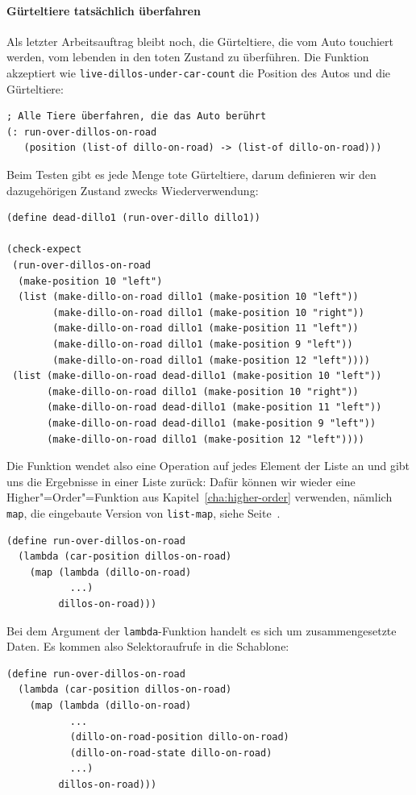 \paragraph{Gürteltiere tatsächlich überfahren} Als letzter
Arbeitsauftrag bleibt noch, die Gürteltiere, die vom Auto touchiert
werden, vom lebenden in den toten Zustand zu überführen.  Die Funktion
akzeptiert wie \lstinline{live-dillos-under-car-count} die Position
des Autos und die Gürteltiere:
%
\begin{lstlisting}
; Alle Tiere überfahren, die das Auto berührt
(: run-over-dillos-on-road
   (position (list-of dillo-on-road) -> (list-of dillo-on-road)))
\end{lstlisting}
%
Beim Testen gibt es jede Menge tote Gürteltiere, darum definieren wir
den dazugehörigen Zustand zwecks Wiederverwendung:
%
\begin{lstlisting}
(define dead-dillo1 (run-over-dillo dillo1))

(check-expect
 (run-over-dillos-on-road
  (make-position 10 "left")
  (list (make-dillo-on-road dillo1 (make-position 10 "left"))
        (make-dillo-on-road dillo1 (make-position 10 "right"))
        (make-dillo-on-road dillo1 (make-position 11 "left"))
        (make-dillo-on-road dillo1 (make-position 9 "left"))
        (make-dillo-on-road dillo1 (make-position 12 "left"))))
 (list (make-dillo-on-road dead-dillo1 (make-position 10 "left"))
       (make-dillo-on-road dillo1 (make-position 10 "right"))
       (make-dillo-on-road dead-dillo1 (make-position 11 "left"))
       (make-dillo-on-road dead-dillo1 (make-position 9 "left"))
       (make-dillo-on-road dillo1 (make-position 12 "left"))))
\end{lstlisting}
%
Die Funktion wendet also eine Operation auf jedes Element der Liste an
und gibt uns die Ergebnisse in einer Liste zurück: Dafür können wir
wieder eine Higher"=Order"=Funktion aus Kapitel~\ref{cha:higher-order}
verwenden, nämlich \lstinline{map}, die eingebaute Version von
\lstinline{list-map}, siehe Seite~\pageref{func:map}.
%
\begin{lstlisting}
(define run-over-dillos-on-road
  (lambda (car-position dillos-on-road)
    (map (lambda (dillo-on-road)
           ...)
         dillos-on-road)))
\end{lstlisting}
%
Bei dem Argument der \lstinline{lambda}-Funktion handelt es sich um
zusammengesetzte Daten.  Es kommen also Selektoraufrufe in die
Schablone:
%
\begin{lstlisting}
(define run-over-dillos-on-road
  (lambda (car-position dillos-on-road)
    (map (lambda (dillo-on-road)
           ...
           (dillo-on-road-position dillo-on-road)
           (dillo-on-road-state dillo-on-road)
           ...)
         dillos-on-road)))
\end{lstlisting}
